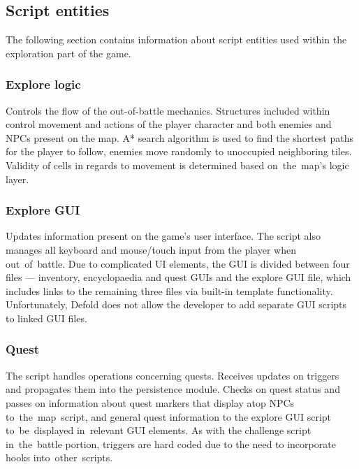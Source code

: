 \documentclass[thesis=B,english,hidelinks]{FITthesisXE}[2012/06/26]
\begin{document}
\subsection{Script entities}

The following section contains information about script entities used within the exploration part of the game.

\subsubsection{Explore logic}

Controls the flow of the out-of-battle mechanics. Structures included within control movement and actions of the player character and both enemies and NPCs present on the map. A* search algorithm is used to find the shortest paths for the player to follow, enemies move randomly to unoccupied neighboring tiles. Validity of cells in regards to movement is determined based on~the~map's logic layer.

\subsubsection{Explore GUI}

Updates information present on the game's user interface. The script also manages all keyboard and mouse/touch input from the player when out~of~battle. Due to complicated UI elements, the GUI is divided between four files --- inventory, encyclopaedia and quest GUIs and the explore GUI file, which includes links to the remaining three files via built-in template functionality. Unfortunately, Defold does not allow the developer to add separate GUI scripts to linked GUI files\autocite{defoldtemplate}.

\newpage

\subsubsection{Quest}

The script handles operations concerning quests. Receives updates on triggers and propagates them into the persistence module. Checks on quest status and passes on information about quest markers that display atop NPCs to~the~map~script, and general quest information to the explore GUI script to~be~displayed in~relevant GUI elements. As with the challenge script in~the~battle portion, triggers are hard coded due to the need to incorporate hooks into~other~scripts.
\end{document}
